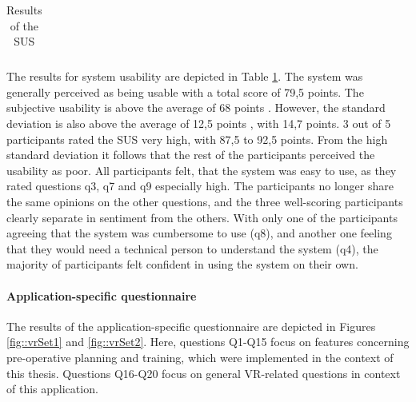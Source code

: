 \begin{table}[ht]
\begin{tabular}{llllllllllll}
    \end{tabular}
    \caption{Results of the SUS}
    \label{tab::sus}
\end{table}

The results for system usability are depicted in Table \ref{tab::sus}.
The system was generally perceived as being usable with a total
score of 79,5 points. The subjective usability is above the
average of 68 points \cite{sauro2016quantifying}.
However, the standard deviation is also above the average of 
12,5 points \cite{sauro2016quantifying}, with 14,7 points.
3 out of 5 participants rated the SUS very high,
with 87,5 to 92,5 points. 
From the high standard deviation it follows that the rest of the 
participants perceived the usability as poor. 
All participants felt, that the system was easy to use,
as they rated questions q3, q7 and q9 especially high.
The participants no longer share the same opinions on the other questions, 
and the three well-scoring participants clearly separate 
in sentiment from the others.
With only one of the participants agreeing that the system
was cumbersome to use (q8), and another one feeling that they
would need a technical person to understand the system (q4),
the majority of participants felt confident in using the system on their own.

\paragraph{Application-specific questionnaire}
The results of the application-specific questionnaire are depicted
in Figures \ref{fig::vrSet1} and \ref{fig::vrSet2}.
Here, questions Q1-Q15 focus on features concerning
pre-operative planning and training, 
which were implemented in the context of this thesis.
Questions Q16-Q20 focus on general VR-related
questions in context of this application.

